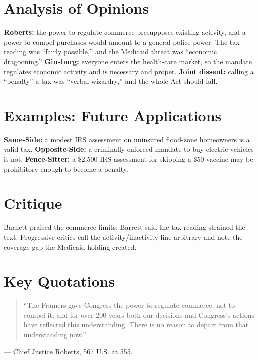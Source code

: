 \documentclass[12pt]{article}
\begin{document}
\section{Analysis of Opinions}
\textbf{Roberts:} the power to regulate commerce presupposes existing activity, and a power to compel purchases would amount to a general police power. The tax reading was ``fairly possible,'' and the Medicaid threat was ``economic dragooning.'' \textbf{Ginsburg:} everyone enters the health-care market, so the mandate regulates economic activity and is necessary and proper. \textbf{Joint dissent:} calling a ``penalty'' a tax was ``verbal wizardry,'' and the whole Act should fall.

\section{Examples: Future Applications}
\textbf{Same-Side:} a modest IRS assessment on uninsured flood-zone homeowners is a valid tax. \textbf{Opposite-Side:} a criminally enforced mandate to buy electric vehicles is not. \textbf{Fence-Sitter:} a \$2,500 IRS assessment for skipping a \$50 vaccine may be prohibitory enough to become a penalty.

\section{Critique}
Barnett praised the commerce limits; Barrett said the tax reading strained the text. Progressive critics call the activity/inactivity line arbitrary and note the coverage gap the Medicaid holding created.

\section{Key Quotations}
\begin{quote}
``The Framers gave Congress the power to regulate commerce, not to compel it, and for over 200 years both our decisions and Congress's actions have reflected this understanding. There is no reason to depart from that understanding now.''
\end{quote}
\noindent --- Chief Justice Roberts, 567 U.S. at 555.
\end{document}
